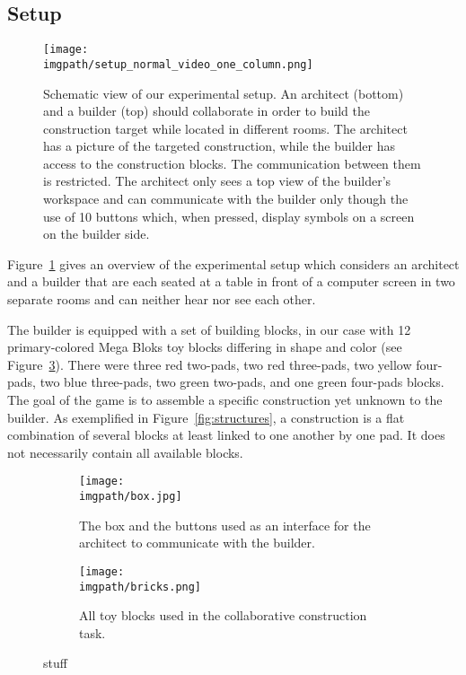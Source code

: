 \subsection{Setup}

\begin{figure}[!ht]
\centering
\texttt{[image: \\imgpath/setup\_normal\_video\_one\_column.png]}
\caption{Schematic view of our experimental setup. An architect (bottom) and a builder (top) should collaborate in order to build the construction target while located in different rooms. The architect has a picture of the targeted construction, while the builder has access to the construction blocks. The communication between them is restricted. The architect only sees a top view of the builder's workspace and can communicate with the builder only though the use of 10 buttons which, when pressed, display symbols on a screen on the builder side.}
\label{fig:overviewsetup}
\end{figure}

Figure~\ref{fig:overviewsetup} gives an overview of the experimental setup which considers an architect and a builder that are each seated at a table in front of a computer screen in two separate rooms and can neither hear nor see each other. 

The builder is equipped with a set of building blocks, in our case with 12 primary-colored Mega Bloks\textsuperscript{\textregistered} toy blocks differing in shape and color (see Figure~\ref{fig:bricks}). There were three red two-pads, two red three-pads, two yellow four-pads, two blue three-pads, two green two-pads, and one green four-pads blocks.
The goal of the game is to assemble a specific construction yet unknown to the builder. As exemplified in Figure~\ref{fig:structures}, a construction is a flat combination of several blocks at least linked to one another by one pad. It does not necessarily contain all available blocks.

\begin{figure}[!ht]
\centering
\begin{subfigure}[b]{0.49\columnwidth}
          \centering
          \texttt{[image: \\imgpath/box.jpg]}
          \caption{The box and the buttons used as an interface for the architect to communicate with the builder.}
          \label{fig:box}
\end{subfigure}
\begin{subfigure}[b]{0.49\columnwidth}
          \centering
          \texttt{[image: \\imgpath/bricks.png]}
          \caption{All toy blocks used in the collaborative construction task.}
          \label{fig:bricks}
\end{subfigure}
\caption{stuff}
\label{fig:stuff}
\end{figure}

